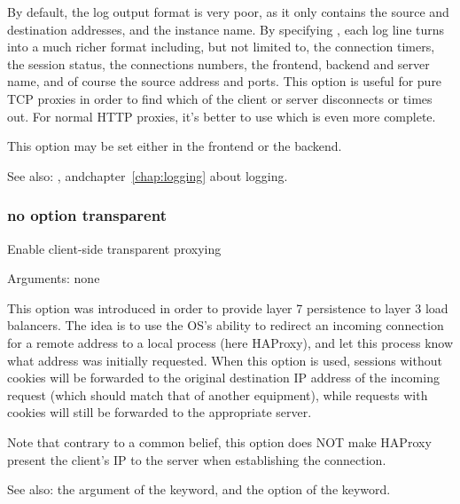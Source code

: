   By default, the log output format is very poor, as it only contains the
  source and destination addresses, and the instance name. By specifying
  , each log line turns into a much richer format including, but
  not limited to, the connection timers, the session status, the connections
  numbers, the frontend, backend and server name, and of course the source
  address and ports. This option is useful for pure TCP proxies in order to
  find which of the client or server disconnects or times out. For normal HTTP
  proxies, it's better to use  which is even more complete.

  This option may be set either in the frontend or the backend.


See also: , andchapter~\ref{chap:logging} about logging.

\subsubsection[transparent]{}
\subsubsection*{no option transparent}

  Enable client-side transparent proxying


  Arguments: none

  This option was introduced in order to provide layer 7 persistence to layer 3
  load balancers. The idea is to use the OS's ability to redirect an incoming
  connection for a remote address to a local process (here HAProxy), and let
  this process know what address was initially requested. When this option is
  used, sessions without cookies will be forwarded to the original destination
  IP address of the incoming request (which should match that of another
  equipment), while requests with cookies will still be forwarded to the
  appropriate server.

  Note that contrary to a common belief, this option does NOT make HAProxy
  present the client's IP to the server when establishing the connection.


See also: the  argument of the  keyword, and the
             option of the  keyword.

\subsubsection[persist rdp-cookie]{}

